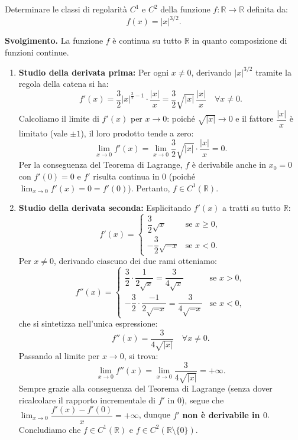 \begin{esbox}[Esercizio svolto — Studio delle classi $C^1$ e $C^2$ di $f(x) = |x|^{3/2}$]
Determinare le classi di regolarità $C^1$ e $C^2$ della funzione $f \colon \mathbb{R} \to \mathbb{R}$ definita da:
\[
    f(x) = |x|^{3/2}.
\]

\medskip
\noindent\textbf{Svolgimento.}
La funzione $f$ è continua su tutto $\mathbb{R}$ in quanto composizione di funzioni continue.
\begin{enumerate}
    \item \textbf{Studio della derivata prima:} Per ogni $x \neq 0$, derivando $|x|^{3/2}$ tramite la regola della catena si ha:
    \[
        f'(x) = \frac{3}{2}|x|^{\frac{3}{2} - 1} \cdot \frac{|x|}{x} = \frac{3}{2}\sqrt{|x|}\,\frac{|x|}{x} \quad \forall x \neq 0.
    \]
    Calcoliamo il limite di $f'(x)$ per $x \to 0$: poiché $\sqrt{|x|} \to 0$ e il fattore $\dfrac{|x|}{x}$ è limitato (vale $\pm 1$), il loro prodotto tende a zero:
    \[
        \lim_{x \to 0} f'(x) = \lim_{x \to 0} \frac{3}{2}\sqrt{|x|} \cdot \frac{|x|}{x} = 0.
    \]
    Per la conseguenza del Teorema di Lagrange, $f$ è derivabile anche in $x_0 = 0$ con $f'(0) = 0$ e $f'$ risulta continua in $0$ (poiché $\lim_{x \to 0} f'(x) = 0 = f'(0)$). Pertanto, $f \in C^1(\mathbb{R})$.

    \item \textbf{Studio della derivata seconda:} Esplicitando $f'(x)$ a tratti su tutto $\mathbb{R}$:
    \[
        f'(x) = \begin{cases} \dfrac{3}{2}\sqrt{x} & \text{se } x \ge 0, \\[6pt] -\dfrac{3}{2}\sqrt{-x} & \text{se } x < 0. \end{cases}
    \]
    Per $x \neq 0$, derivando ciascuno dei due rami otteniamo:
    \[
        f''(x) = \begin{cases} \dfrac{3}{2} \cdot \dfrac{1}{2\sqrt{x}} = \dfrac{3}{4\sqrt{x}} & \text{se } x > 0, \\[8pt] -\dfrac{3}{2} \cdot \dfrac{-1}{2\sqrt{-x}} = \dfrac{3}{4\sqrt{-x}} & \text{se } x < 0, \end{cases}
    \]
    che si sintetizza nell'unica espressione:
    \[
        f''(x) = \frac{3}{4\sqrt{|x|}} \quad \forall x \neq 0.
    \]
    Passando al limite per $x \to 0$, si trova:
    \[
        \lim_{x \to 0} f''(x) = \lim_{x \to 0} \frac{3}{4\sqrt{|x|}} = +\infty.
    \]
    Sempre grazie alla conseguenza del Teorema di Lagrange (senza dover ricalcolare il rapporto incrementale di $f'$ in $0$), segue che $\lim_{x \to 0} \dfrac{f'(x) - f'(0)}{x} = +\infty$, dunque $f'$ \textbf{non è derivabile in $0$}. Concludiamo che $f \in C^1(\mathbb{R})$ e $f \in C^2(\mathbb{R} \setminus \{0\})$.
\end{enumerate}
\end{esbox}

